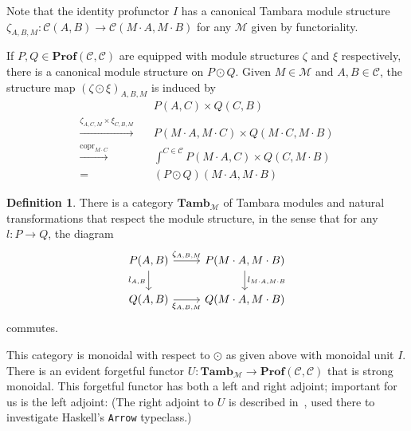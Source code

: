 \documentclass[11pt,letterpaper]{article}
\theoremstyle{plain}
\theoremstyle{definition}
\newtheorem{definition}[theorem]{Definition}
\newcommand{\C}{\mathscr{C}}
\newcommand{\M}{\mathscr{M}}
\newcommand{\Prof}{\mathbf{Prof}}
\newcommand{\Tamb}{\mathbf{Tamb}}
\DeclareMathOperator{\copr}{copr}
\newcommand{\act}{\cdot}
\begin{document}
Note that the identity profunctor $I$ has a canonical Tambara module structure $\zeta_{A, B, M} : \C(A, B) \to \C(M \act A, M \act B)$ for any $\M$ given by functoriality.

If $P, Q \in \Prof(\C, \C)$ are equipped with module structures $\zeta$ and $\xi$ respectively, there is a canonical module structure on $P \odot Q$. Given $M \in \M$ and $A,B \in \C$, the structure map ${(\zeta \odot \xi)}_{A,B,M}$ is induced by
\begin{align*}
  &P(A,C) \times Q(C,B)  \\
  \xrightarrow{\zeta_{A,C,M} \times \xi_{C,B,M}} \quad& P(M\act A, M\act C) \times Q(M\act C, M\act B) \\
  \xrightarrow{\copr_{M\act C}} \quad&\int^{C \in \C} P(M\act A, C) \times Q(C, M\act B) \\
  = \quad&(P \odot Q)(M\act A, M\act B)
\end{align*}

\begin{definition}
  There is a category $\Tamb_\M$ of Tambara modules and natural transformations that respect the module structure, in the sense that for any $l : P \to Q$, the diagram
  \[
    \begin{tikzcd}
      P(A,B) \ar[r, "\zeta_{A,B,M}"] \ar[d, "l_{A,B}" left] & P(M\act A, M\act B) \ar[d, "l_{M\act A, M\act B}" right] \\
      Q(A,B) \ar[r, "\xi_{A,B,M}" swap] & Q(M \act A, M \act B)
    \end{tikzcd}
  \]
  commutes.
\end{definition}

This category is monoidal with respect to $\odot$ as given above with monoidal unit $I$. There is an evident forgetful functor $U : \Tamb_\M \to \Prof(\C, \C)$ that is strong monoidal. This forgetful functor has both a left and right adjoint; important for us is the left adjoint: (The right adjoint to $U$ is described in~\cite{NotionsOfComputationAsMonoids}, used there to investigate Haskell's \texttt{Arrow} typeclass.)
\end{document}
